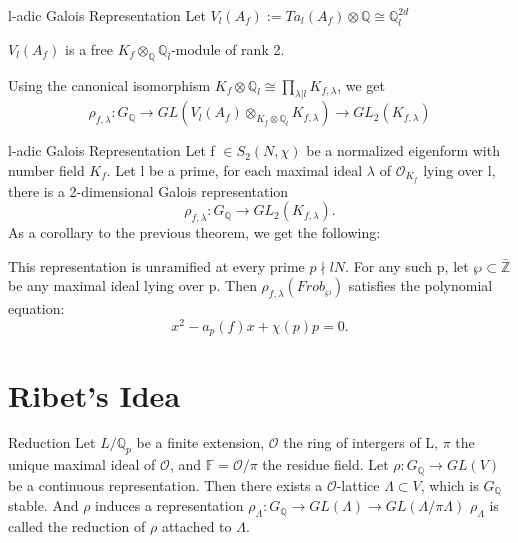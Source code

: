 \documentclass{beamer}
\theoremstyle{plain}
\theoremstyle{definition}
\theoremstyle{remark}
\newcommand{\Q}{\mathbb{Q}}
\newcommand{\Z}{\mathbb{Z}}
\newcommand{\F}{\mathbb{F}}
\newcommand{\mo}{\mathcal{O}}
\begin{document}
\begin{frame}{l-adic Galois Representation}
    Let $V_l(A_f):=Ta_l(A_f) \otimes \Q \cong \Q_l^{2d}$
    \begin{lemma}
        $V_l(A_f)$ is a free $K_f \otimes_{\Q} \Q_l$-module of rank 2.
    \end{lemma}
    Using the canonical isomorphism
    $K_f \otimes \Q_l \cong \prod_{\lambda | l}K_{f,\lambda}$, we get
    \[\rho_{f,\lambda} : G_{\Q} \to GL(V_l(A_f)\otimes_{K_f \otimes \Q_l}K_{f,\lambda} ) \to GL_2(K_{f,\lambda})\]

\end{frame}

\begin{frame}{l-adic Galois Representation}
    Let f $\in S_2(N,\chi)$ be a normalized eigenform with number field $K_f$.
        Let l be a prime, for each maximal ideal $\lambda$ of $\mo_{K_f}$ lying over l,
        there is a 2-dimensional Galois representation
        \[\rho_{f,\lambda}: G_{\Q}\to GL_2(K_{f,\lambda}).\]
    As a corollary to the previous theorem, we get the following:
    \begin{theorem}
        This representation is unramified at every prime $p \nmid lN$. For any such
        p, let $\wp \subset \bar{\Z}$ be any maximal ideal lying over p. Then $\rho_{f,\lambda}(Frob_{\wp})$ satisfies
        the polynomial equation:
        \[x^2-a_p(f)x+\chi(p)p=0.\]
    \end{theorem}
\end{frame}


\section{Ribet's Idea}

\begin{frame}{Reduction}
    Let $L/\Q_p$ be a finite extension, $\mo$ the ring of intergers of L, $\pi$ the
    unique maximal ideal of $\mo$, and $\F= \mo / \pi$ the residue field.
    \vskip 0.2cm
    Let $\rho: G_{\Q} \to GL(V)$ be a continuous representation. Then there exists a $\mo$-lattice $\Lambda \subset V$,
    which is $G_{\Q}$ stable.
    \vskip 0.2cm
    And $\rho $ induces a representation $\rho_{\Lambda}: G_{\Q} \to GL(\Lambda) \to GL(\Lambda/ \pi \Lambda )$
    \vskip 0.2cm
    $\rho_{\Lambda }$ is called the reduction of $\rho$ attached to $\Lambda$.
\end{frame}
\end{document}
